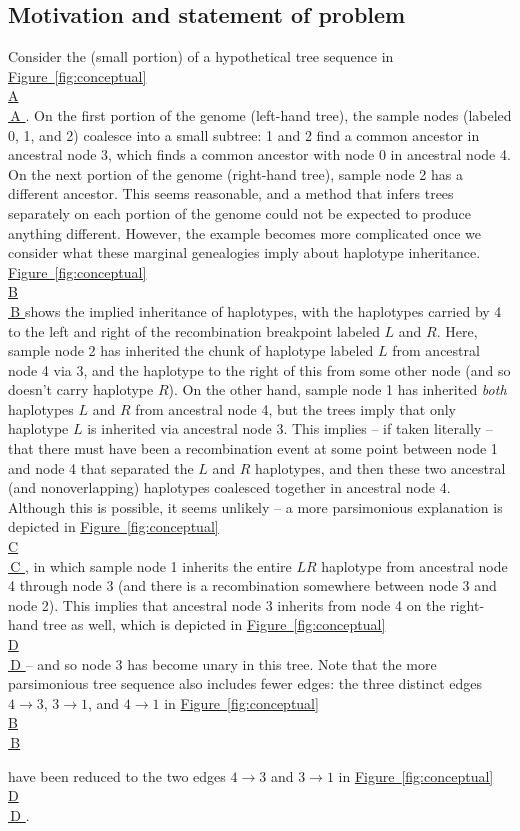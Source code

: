 \documentclass[10pt,twoside,lineno]{gsajnl}
\newcommand*{\figref}[2][]{%
	\hyperref[{#2}]{%
		Figure~\ref*{#2}%
		\ifx\\#1\\%
		\else
		\,#1%
		\fi
	}%
}
\begin{document}
\subsection{Motivation and statement of problem}


Consider the (small portion) of a hypothetical tree sequence in \figref[A]{fig:conceptual}.
On the first portion of the genome (left-hand tree), the sample nodes (labeled 0, 1, and 2)
coalesce into a small subtree: 1 and 2 find a common ancestor in ancestral node 3,
which finds a common ancestor with node 0 in ancestral node 4.
On the next portion of the genome (right-hand tree), sample node 2 has a different ancestor.
This seems reasonable, and a method that infers trees separately on each portion of the genome
could not be expected to produce anything different.
However, the example becomes more complicated once we consider what these marginal genealogies imply about haplotype inheritance.
\figref[B]{fig:conceptual} shows the implied inheritance of haplotypes,
with the haplotypes carried by 4 to the left and right of the recombination breakpoint labeled $L$ and $R$.
Here, sample node 2 has inherited the chunk of haplotype labeled $L$ from ancestral node 4 via 3,
and the haplotype to the right of this from some other node (and so doesn't carry haplotype $R$).
On the other hand, sample node 1 has inherited \emph{both} haplotypes $L$ and $R$
from ancestral node 4, but the trees imply that only haplotype $L$ is inherited via ancestral node 3.
This implies -- if taken literally -- that there must have been a recombination event
at some point between node 1 and node 4 that separated the $L$ and $R$ haplotypes,
and then these two ancestral (and nonoverlapping) haplotypes coalesced together in ancestral node 4.
Although this is possible, it seems unlikely --
a more parsimonious explanation is depicted in \figref[C]{fig:conceptual},
in which sample node 1 inherits the entire $LR$ haplotype from ancestral node 4 through node 3
(and there is a recombination somewhere between node 3 and node 2).
This implies that ancestral node 3 inherits from node 4 on the right-hand tree as well,
which is depicted in \figref[D]{fig:conceptual} --
and so node 3 has become unary in this tree.
Note that the more parsimonious tree sequence also includes fewer edges:
the three distinct edges $4 \to 3$, $3 \to 1$, and $4 \to 1$ in \figref[B]{fig:conceptual}
have been reduced to the two edges
$4 \to 3$ and $3 \to 1$ in \figref[D]{fig:conceptual}.
\end{document}
